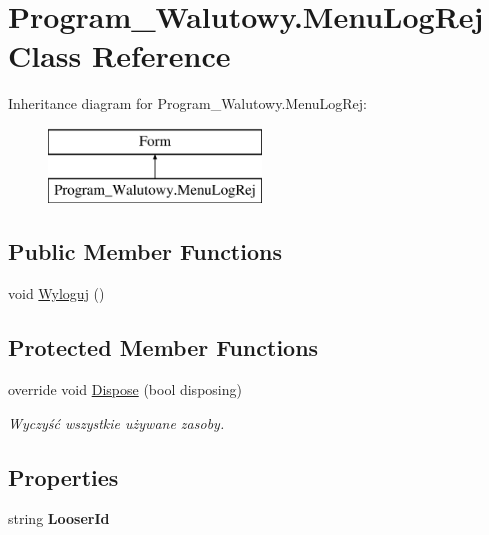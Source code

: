 \hypertarget{class_program___walutowy_1_1_menu_log_rej}{}\section{Program\+\_\+\+Walutowy.\+Menu\+Log\+Rej Class Reference}
\label{class_program___walutowy_1_1_menu_log_rej}
Inheritance diagram for Program\+\_\+\+Walutowy.\+Menu\+Log\+Rej\+:\begin{figure}[H]
\begin{center}
\leavevmode
\includegraphics[height=2.000000cm]{class_program___walutowy_1_1_menu_log_rej}
\end{center}
\end{figure}
\subsection*{Public Member Functions}
\begin{DoxyCompactItemize}
\item 
void \mbox{\hyperlink{class_program___walutowy_1_1_menu_log_rej_a22bdce7e6249bde0397ca4b132e6884b}{Wyloguj}} ()
\end{DoxyCompactItemize}
\subsection*{Protected Member Functions}
\begin{DoxyCompactItemize}
\item 
override void \mbox{\hyperlink{class_program___walutowy_1_1_menu_log_rej_af8df097779dee93338a05bc8c900342d}{Dispose}} (bool disposing)
\begin{DoxyCompactList}\small\item\em Wyczyść wszystkie używane zasoby. \end{DoxyCompactList}\end{DoxyCompactItemize}
\subsection*{Properties}
\begin{DoxyCompactItemize}
\item 
\mbox{\label{class_program___walutowy_1_1_menu_log_rej_a5748c514b95eb0ba20e84338abc474d8}} 
string {\bfseries Looser\+Id}
\end{DoxyCompactItemize}


